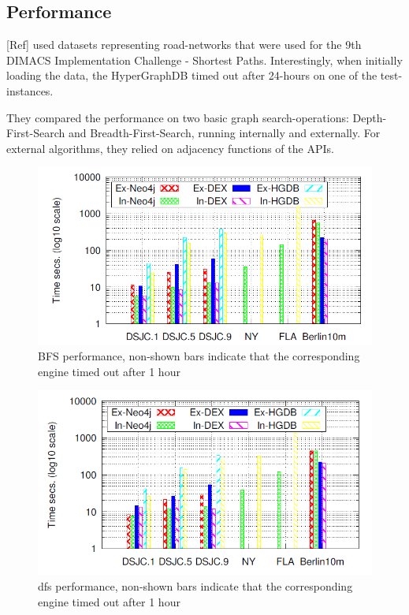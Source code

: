 \documentclass{acm_proc_article-sp}
\begin{document}
\subsection{Performance}

[Ref] used datasets representing road-networks that were used for the 9th DIMACS Implementation Challenge - Shortest Paths. Interestingly, when initially loading the data, the HyperGraphDB timed out after 24-hours on one of the test-instances.

They compared the performance on two basic graph search-operations: Depth-First-Search and Breadth-First-Search, running internally and externally. For external algorithms, they relied on adjacency functions of the APIs.

\begin{figure}[hbtp]
	\centering
	\includegraphics[scale=0.35]{bfs.png}
	\caption{BFS performance, non-shown bars indicate that
		the corresponding engine timed out after 1 hour}
\end{figure}

\begin{figure}[hbtp]
	\centering
	\includegraphics[scale=0.35]{dfs.png}
	\caption{dfs performance, non-shown bars indicate that
		the corresponding engine timed out after 1 hour}
\end{figure}
\end{document}
